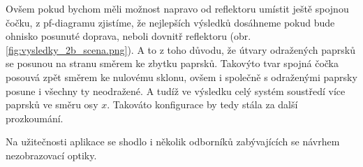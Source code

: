 Ovšem pokud bychom měli možnost napravo od reflektoru umístit ještě spojnou čočku, z pf-diagramu zjistíme, že nejlepších výsledků dosáhneme pokud bude ohnisko posunuté doprava, neboli dovnitř reflektoru (obr. \ref{fig:vysledky_2b_scena.png}). A to z toho důvodu, že útvary odražených paprsků se posunou na stranu směrem ke zbytku paprsků. Takovýto tvar spojná čočka posouvá zpět směrem ke nulovému sklonu, ovšem i společně s odraženými paprsky posune i všechny ty neodražené. A tudíž ve výsledku celý systém soustředí více paprsků ve směru osy $x$. Takováto konfigurace by tedy stála za další prozkoumání.

Na užitečnosti aplikace se shodlo i několik odborníků zabývajících se návrhem nezobrazovací optiky.\src {}
